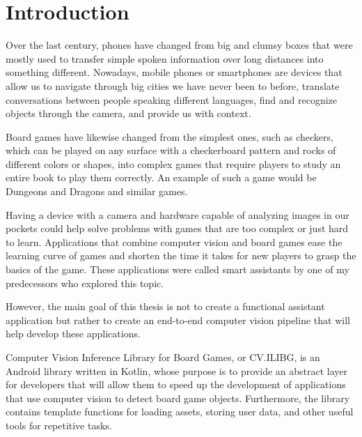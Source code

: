 
% 

\chapter{Introduction}
Over the last century, phones have changed from big and clumsy boxes that were mostly used to transfer simple spoken information over long distances into something different. Nowadays, mobile phones or smartphones are devices that allow us to navigate through big cities we have never been to before, translate conversations between people speaking different languages, find and recognize objects through the camera, and provide us with context.

Board games have likewise changed from the simplest ones, such as checkers, which can be played on any surface with a checkerboard pattern and rocks of different colors or shapes, into complex games that require players to study an entire book to play them correctly. An example of such a game would be Dungeons and Dragons and similar games. 

Having a device with a camera and hardware capable of analyzing images in our pockets could help solve problems with games that are too complex or just hard to learn. Applications that combine computer vision and board games ease the learning curve of games and shorten the time it takes for new players to grasp the basics of the game. These applications were called smart assistants by one of my predecessors who explored this topic. 

However, the main goal of this thesis is not to create a functional assistant application but rather to create an end-to-end computer vision pipeline that will help develop these applications.

Computer Vision Inference Library for Board Games, or CV.ILIBG, is an Android library written in Kotlin, whose purpose is to provide an abstract layer for developers that will allow them to speed up the development of applications that use computer vision to detect board game objects. Furthermore, the library contains template functions for loading assets, storing user data, and other useful tools for repetitive tasks.

